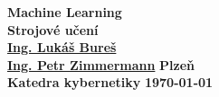 \documentclass[12pt, a4paper]{report}
\begin{document}
 
\begin{titlepage}
\begin{center}
	\vspace*{\fill}
	\textbf{\Huge{Machine Learning\\ Strojové učení}}\\
	\vspace*{\fill}
	\textbf{\large{\href{mailto:LBures@kky.zcu.cz}{Ing. Lukáš Bureš}}} \hfill ~\\
	\textbf{\large{\href{mailto:PetrZim@kky.zcu.cz}{Ing. Petr Zimmermann}}} \hfill \textbf{\large{Plzeň}}\\
	\textbf{\large{Katedra kybernetiky}} \hfill \textbf{\large{\today}}
\end{center}
\end{titlepage}


\setcounter{page}{1}

\tableofcontents
\newpage

\setcounter{page}{1}







%
%
\end{document}
